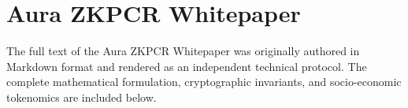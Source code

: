 \documentclass[12pt]{article}
\begin{document}
\section*{Aura ZKPCR Whitepaper}

The full text of the Aura ZKPCR Whitepaper was originally authored in Markdown format and rendered as an independent technical protocol. The complete mathematical formulation, cryptographic invariants, and socio-economic tokenomics are included below.


\end{document}
